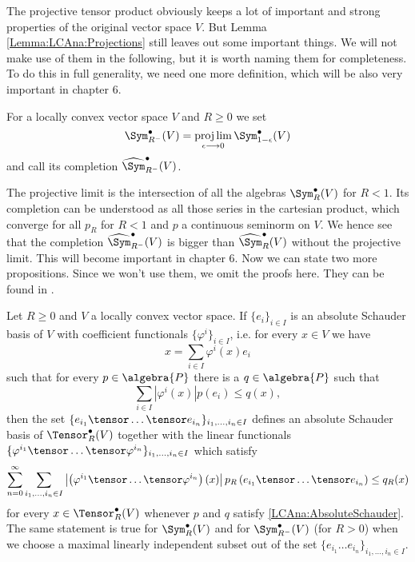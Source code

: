 The projective tensor product obviously keeps a lot of important and 
strong properties of the original vector space $V$. But Lemma 
\ref{Lemma:LCAna:Projections} still leaves out some important things. 
We will not make use of them in the following, but it is worth naming 
them for completeness. To do this in full generality, we 
need one more definition, which will be also very important in chapter 6.
\begin{definition}\label{ProjectiveLimit}
	For a locally convex vector space $V$ and $R \geq 0$ we set
	\begin{equation*}
		\Sym_{R^-}^{\bullet}(V)
		=
		\projlim\limits_{\epsilon \longrightarrow 0}
		\Sym_{1 - \epsilon}^{\bullet}(V)
	\end{equation*}
	and call its completion $\widehat{\Sym}_{R^-}^{\bullet}(V)$.
\end{definition}
The projective limit is the intersection of all the algebras 
$\Sym_R^{\bullet}(V)$ for $R < 1$. Its completion can be understood as all 
those series in the cartesian product, which converge for all $p_R$ for $R < 1$ 
and $p$ a continuous seminorm on $V$. We hence see that the completion 
$\widehat{\Sym}_{R^-}^{\bullet}(V)$ is bigger than $\widehat{\Sym}_R^{\bullet}
(V)$ without the projective limit. This will become important in chapter 6.
Now we can state two more propositions. Since we won't use them, we omit the 
proofs here. They can be found in \cite{waldmann:2014a}.
\begin{proposition}
	\label{Prop:LCAna:Bases}
	Let $R \geq 0$ and $V$ a locally convex vector space.
	If $\{e_i\}_{i \in I}$ is an absolute Schauder basis of $V$ with 
	coefficient functionals $\{\varphi^i\}_{i \in I}$, i.e. for every 
	$x \in V$ we have
	\begin{equation*}
		x
		=
		\sum\limits_{i \in I}
		\varphi^i(x) e_i
	\end{equation*}
	such that for every $p \in \algebra{P}$ there is a 
	$q \in \algebra{P}$ such that
	\begin{equation}
		\label{LCAna:AbsoluteSchauder}
		\sum\limits_{i \in I}
		|\varphi^i(x)|
		p(e_i)
		\leq
		q(x),
	\end{equation}
	then the set 
	$\{e_{i_1} \tensor \ldots \tensor e_{i_n}\}_{i_1, \ldots, i_n \in I}$ 
	defines an absolute Schauder basis of $\Tensor_R^{\bullet}(V)$ 
	together with the linear functionals $\{\varphi^{i_1} \tensor \ldots 
	\tensor 	\varphi^{i_n}\}_{i_1, \ldots, i_n \in I}$ which satisfy
	\begin{equation*}
		\sum\limits_{n=0}^{\infty}
		\sum\limits_{i_1, \ldots, i_n \in I}
		\left| 
			\left(
				\varphi^{i_1} \tensor \ldots \tensor \varphi^{i_n}
			\right)
			(x)
		\right|
		p_R \left(
			e_{i_1} \tensor \ldots \tensor e_{i_n}
		\right)
		\leq
		q_R (x)
	\end{equation*}
	for every $x \in \Tensor_R^{\bullet}(V)$ whenever $p$ and $q$ satisfy 
	\eqref{LCAna:AbsoluteSchauder}. The same statement is true for 
	$\Sym_R^{\bullet}(V)$ and for $\Sym_{R^-}^{\bullet}(V)$ (for $R > 0$) when 
	we choose a maximal linearly independent subset out of the set $\{e_{i_1} 
	\ldots e_{i_n}\}_{i_1, \ldots, i_n \in I}$.
\end{proposition}
